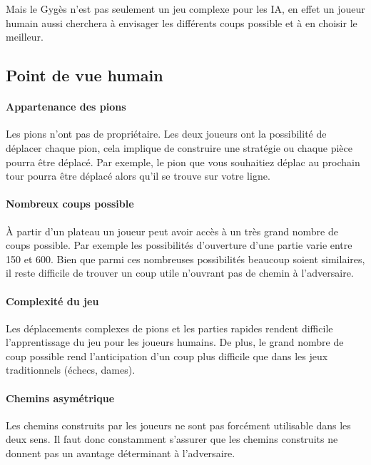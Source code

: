 	\vspace{2em}
	Mais le Gygès n'est pas seulement un jeu complexe pour les IA, en effet un joueur humain aussi
	cherchera à envisager les différents coups possible et à en choisir le meilleur.

	\subsection{Point de vue humain}

		\paragraph{Appartenance des pions} Les pions n'ont pas de propriétaire. Les deux joueurs ont la possibilité
		de déplacer chaque pion, cela implique de construire une stratégie ou chaque pièce pourra être déplacé.
		Par exemple, le pion que vous souhaitiez déplac au prochain tour pourra être déplacé alors qu'il se trouve
		sur votre ligne.

		\paragraph{Nombreux coups possible} \`A partir d'un plateau un joueur peut avoir accès à un très grand nombre de
		coups possible. Par exemple les possibilités d'ouverture d'une partie varie entre 150 et 600. Bien que parmi
		ces nombreuses possibilités beaucoup soient similaires, il reste difficile de trouver un coup utile n'ouvrant pas
		de chemin à l'adversaire.

		\paragraph{Complexité du jeu} Les déplacements complexes de pions et les parties rapides rendent difficile l'apprentissage
		du jeu pour les joueurs humains. De plus, le grand nombre de coup possible rend l'anticipation d'un coup plus difficile que
		dans les jeux traditionnels (échecs, dames).

		\paragraph{Chemins asymétrique} Les chemins construits par les joueurs ne sont pas forcément utilisable dans les deux sens.
		Il faut donc constamment s'assurer que les chemins construits ne donnent pas un avantage déterminant à l'adversaire.

